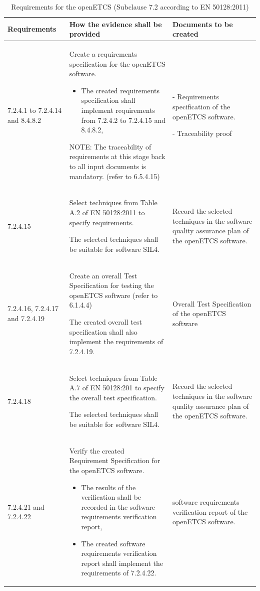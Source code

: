 \documentclass{template/openetcs_report}
\begin{document}
{\footnotesize\sffamily\centering
\begin{longtable}{|p{2cm}|p{9cm}|p{3cm}|}
\caption{Requirements for the openETCS (Subclause 7.2 according to EN 50128:2011)}\\
\hline
\bfseries Requirements & \bfseries How the evidence shall be provided & \bfseries Documents to be created\\
\hline
\hline
\endhead
\hline
\endfoot

7.2.4.1 to 7.2.4.14 and 8.4.8.2 & Create a requirements specification for the openETCS software.
\begin{itemize}\itemsep=0pt
  \item The created requirements specification shall implement requirements from 7.2.4.2 to 7.2.4.15 and 8.4.8.2,
\end{itemize}
NOTE: \linebreak
The traceability of requirements at this stage back to all input documents is mandatory. (refer to 6.5.4.15)
& - Requirements specification of the openETCS software.

- Traceability proof\\ 
\hline
7.2.4.15 & Select techniques from Table A.2 of EN 50128:2011 to specify requirements.

The selected techniques shall be suitable for software SIL4.
& Record the selected techniques in the software quality assurance plan of the openETCS software.\\ 
\hline
7.2.4.16, 7.2.4.17 and 7.2.4.19 & Create an overall Test Specification for testing the openETCS software (refer to 6.1.4.4)

The created overall test specification shall also implement the requirements of 7.2.4.19.
& Overall Test Specification of the openETCS software \\ 
\hline
7.2.4.18 & Select techniques from Table A.7 of EN 50128:201 to specify the overall test specification.

The selected techniques shall be suitable for software SIL4.
& Record the selected techniques in the software quality assurance plan of the openETCS software.\\ 
\hline
7.2.4.21 and 7.2.4.22 & Verify the created Requirement Specification for the openETCS software. 
\begin{itemize}\itemsep=0pt
  \item The results of the verification shall be recorded in the software requirements verification report,
  \item The created software requirements verification report shall implement the requirements of 7.2.4.22. 
\end{itemize}
& software requirements verification report of the openETCS software.\\ 
\hline
\end{longtable}}
\end{document}
